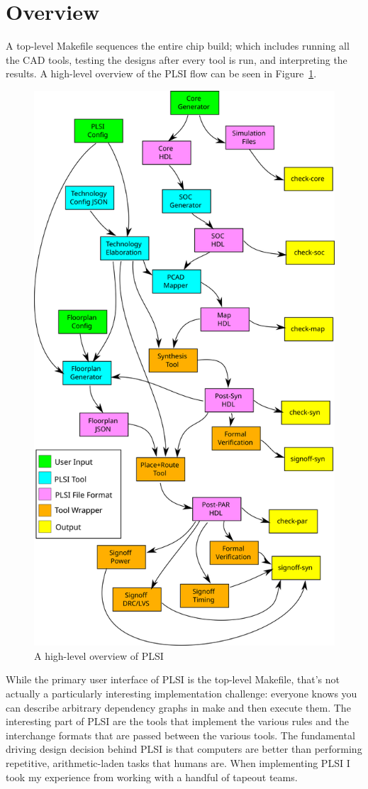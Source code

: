 \documentclass{article}
\begin{document}
\section{Overview}

A top-level Makefile sequences the entire chip build; which includes running
all the CAD tools, testing the designs after every tool is run, and
interpreting the results.  A high-level overview of the PLSI flow can be seen
in Figure~\ref{impl:plsi-flow}.

\begin{figure}
\begin{center}
\includegraphics[width=0.7\linewidth]{figures/plsi-flow.svg}
\end{center}
\caption{A high-level overview of PLSI}
\label{impl:plsi-flow}
\end{figure}

While the primary user interface of PLSI is the top-level Makefile, that's not
actually a particularly interesting implementation challenge: everyone knows
you can describe arbitrary dependency graphs in make and then execute them.
The interesting part of PLSI are the tools that implement the various rules and
the interchange formats that are passed between the various tools.  The
fundamental driving design decision behind PLSI is that computers are better
than performing repetitive, arithmetic-laden tasks that humans are.  When
implementing PLSI I took my experience from working with a handful of tapeout
teams.
\end{document}
